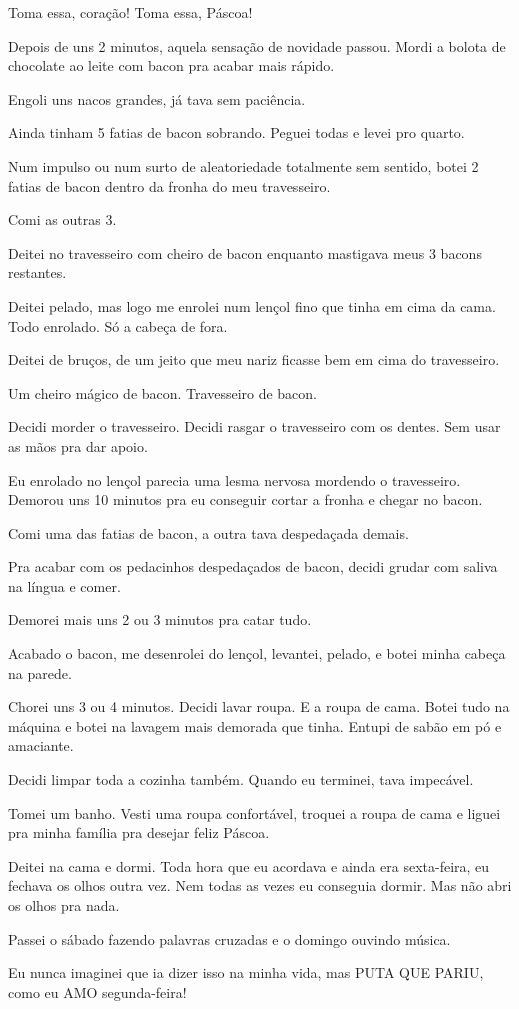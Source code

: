 Toma essa, coração! Toma essa, Páscoa!

Depois de uns 2 minutos, aquela sensação de novidade passou. Mordi a bolota de chocolate ao leite com bacon pra acabar mais rápido.

Engoli uns nacos grandes, já tava sem paciência.

Ainda tinham 5 fatias de bacon sobrando. Peguei todas e levei pro quarto.

Num impulso ou num surto de aleatoriedade totalmente sem sentido, botei 2 fatias de bacon dentro da fronha do meu travesseiro.

Comi as outras 3.

Deitei no travesseiro com cheiro de bacon enquanto mastigava meus 3 bacons restantes.

Deitei pelado, mas logo me enrolei num lençol fino que tinha em cima da cama. Todo enrolado. Só a cabeça de fora.

Deitei de bruços, de um jeito que meu nariz ficasse bem em cima do travesseiro.

Um cheiro mágico de bacon. Travesseiro de bacon.

Decidi morder o travesseiro. Decidi rasgar o travesseiro com os dentes. Sem usar as mãos pra dar apoio.

Eu enrolado no lençol parecia uma lesma nervosa mordendo o travesseiro. Demorou uns 10 minutos pra eu conseguir cortar a fronha e chegar no bacon.

Comi uma das fatias de bacon, a outra tava despedaçada demais.

Pra acabar com os pedacinhos despedaçados de bacon, decidi grudar com saliva na língua e comer.

Demorei mais uns 2 ou 3 minutos pra catar tudo.

Acabado o bacon, me desenrolei do lençol, levantei, pelado, e botei minha cabeça na parede.

Chorei uns 3 ou 4 minutos. Decidi lavar roupa. E a roupa de cama. Botei tudo na máquina e botei na lavagem mais demorada que tinha. Entupi de sabão em pó e amaciante.

Decidi limpar toda a cozinha também. Quando eu terminei, tava impecável.

Tomei um banho. Vesti uma roupa confortável, troquei a roupa de cama e liguei pra minha família pra desejar feliz Páscoa.

Deitei na cama e dormi. Toda hora que eu acordava e ainda era sexta-feira, eu fechava os olhos outra vez. Nem todas as vezes eu conseguia dormir. Mas não abri os olhos pra nada.

Passei o sábado fazendo palavras cruzadas e o domingo ouvindo música.

Eu nunca imaginei que ia dizer isso na minha vida, mas PUTA QUE PARIU, como eu AMO segunda-feira!
